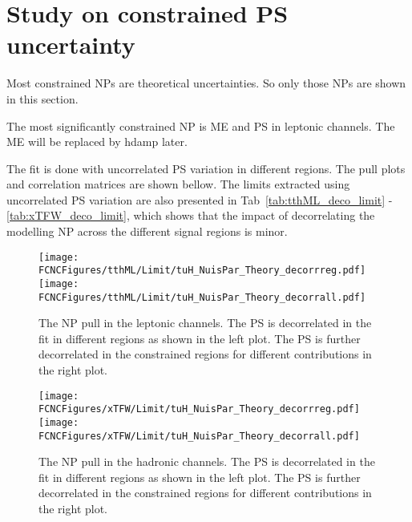 \section{Study on constrained PS uncertainty}
\label{sec:decor}
Most constrained NPs are theoretical uncertainties. So only those NPs are shown in this section.

The most significantly constrained NP is ME and PS in leptonic channels. The ME will be replaced by hdamp later.

The fit is done with uncorrelated PS variation in different regions. The pull plots and correlation matrices are shown bellow. The limits extracted using uncorrelated PS variation are also presented in Tab~\ref{tab:tthML_deco_limit} - \ref{tab:xTFW_deco_limit}, which shows that the impact of decorrelating the modelling NP across the different signal regions is minor.

\begin{figure}[H]
\centering
\texttt{[image: \\FCNCFigures/tthML/Limit/tuH\_NuisPar\_Theory\_decorrreg.pdf]}
\texttt{[image: \\FCNCFigures/tthML/Limit/tuH\_NuisPar\_Theory\_decorrall.pdf]}
\caption{ The NP pull in the leptonic channels. The PS is decorrelated in the fit in different regions as shown in the left plot. The PS is further decorrelated in the constrained regions for different contributions in the right plot. }
\label{fig:tuH_NuisPar_decorr}
\end{figure}

\begin{figure}[H]
\centering
\texttt{[image: \\FCNCFigures/xTFW/Limit/tuH\_NuisPar\_Theory\_decorrreg.pdf]}
\texttt{[image: \\FCNCFigures/xTFW/Limit/tuH\_NuisPar\_Theory\_decorrall.pdf]}
\caption{ The NP pull in the hadronic channels. The PS is decorrelated in the fit in different regions as shown in the left plot. The PS is further decorrelated in the constrained regions for different contributions in the right plot. }
\label{fig:tuH_NuisPar_decorr_had}
\end{figure}

